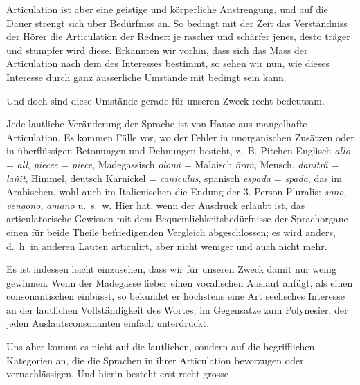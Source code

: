 Articulation ist aber eine geistige und körperliche Anstrengung, und auf die Dauer strengt sich  über Bedürfniss an. So bedingt mit der Zeit das Verständniss der Hörer die Articulation der Redner: je rascher und schärfer jenes, desto träger und stumpfer wird diese. Erkannten wir vorhin, dass sich das Mass der Articulation nach dem des Interesses bestimmt, so sehen wir nun, wie dieses Interesse durch ganz äusserliche Umstände mit bedingt sein kann.

\largerpage[-1]Und doch sind diese Umstände gerade für unseren Zweck recht bedeutsam.

Jede lautliche Veränderung der Sprache ist von Hause aus mangelhafte Articulation. Es kommen Fälle vor, wo der Fehler in unorganischen Zusätzen oder in überflüssigen Betonungen und Dehnungen besteht, z.~B. Pitchen-Englisch \textit{allo} = \textit{all}, \textit{piecee} = \textit{piece}, Madegassisch \textit{olonă} = Malaisch \textit{ōraṅ}, Mensch, \textit{danitră} = \textit{laṅit}, Himmel, deutsch Karnickel = \textit{caniculus}, spanisch \textit{espada} = \textit{spada}, das  im Arabischen, wohl auch im Italienischen die Endung der 3. Person Pluralis: \textit{sono}, \textit{vengono}, \textit{amano} u.~s.~w. Hier hat, wenn der Ausdruck erlaubt ist, das articulatorische Gewissen mit dem Bequemlichkeitsbedürfnisse der Sprachorgane einen für beide Theile befriedigenden Vergleich abgeschlossen; es wird anders, d.~h. in anderen Lauten articulirt, aber nicht weniger und auch nicht mehr.

Es ist indessen leicht einzusehen, dass wir für unseren Zweck damit nur wenig gewinnen. Wenn der Madegasse lieber einen vocalischen Auslaut anfügt, als einen consonantischen einbüsst, so bekundet er höchstens eine Art seelisches Interesse an der lautlichen Vollständigkeit des Wortes, im Gegensatze zum Polynesier, der jeden Auslautsconsonanten einfach unterdrückt.

Uns aber kommt es nicht auf die lautlichen, sondern auf die begrifflichen Kategorien an, die die Sprachen in ihrer Articulation bevorzugen oder vernachlässigen. Und hierin besteht erst recht grosse 

